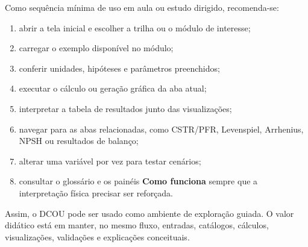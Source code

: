 Como sequência mínima de uso em aula ou estudo dirigido, recomenda-se:

\begin{enumerate}
    \item abrir a tela inicial e escolher a trilha ou o módulo de interesse;
    \item carregar o exemplo disponível no módulo;
    \item conferir unidades, hipóteses e parâmetros preenchidos;
    \item executar o cálculo ou geração gráfica da aba atual;
    \item interpretar a tabela de resultados junto das visualizações;
    \item navegar para as abas relacionadas, como CSTR/PFR, Levenspiel, Arrhenius, NPSH ou resultados de balanço;
    \item alterar uma variável por vez para testar cenários;
    \item consultar o glossário e os painéis \textbf{Como funciona} sempre que a interpretação física precisar ser reforçada.
\end{enumerate}

Assim, o DCOU pode ser usado como ambiente de exploração guiada. O valor didático está em manter, no mesmo fluxo, entradas, catálogos, cálculos, visualizações, validações e explicações conceituais.
